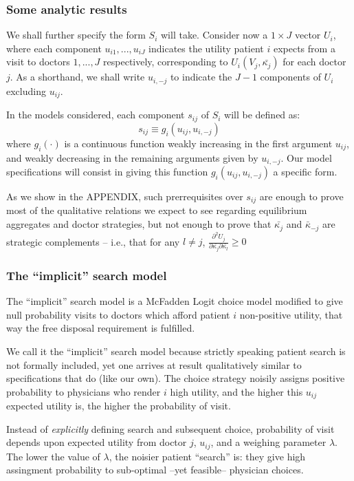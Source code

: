 \documentclass{article}
\begin{document}
\subsubsection{Some analytic results}

We shall further specify the form $S_i$ will take. Consider now a $1 \times J$ vector $U_i$, where each component $u_{i1}, ... , u_{iJ}$ indicates the utility patient $i$ expects from a visit to doctors $1, ..., J$ respectively, corresponding to $U_i(V_j, \bar{\kappa_j})$ for each doctor $j$. As a shorthand, we shall write $u_{i,-j}$ to indicate the $J - 1$ components of $U_i$ excluding $u_{ij}$.

In the models considered, each component $s_{ij}$ of $S_i$ will be defined as:
\[s_{ij} \equiv g_i(u_{ij}, u_{i,-j})\]
where $g_i(\cdot)$ is a continuous function weakly increasing in the first argument $u_{ij}$, and weakly decreasing in the remaining arguments given by $u_{i,-j}$. Our model specifications will consist in giving this function $g_i(u_{ij}, u_{i,-j})$ a specific form.

As we show in the APPENDIX, such prerrequisites over $s_{ij}$ are enough to prove most of the qualitative relations we expect to see regarding equilibrium aggregates and doctor strategies, but not enough to prove that $\bar{\kappa_j}$ and $\bar{\kappa}_{-j}$ are strategic complements -- i.e., that for any $l \neq j$, $\frac{\partial^2 U_{j}}{\partial\bar{\kappa_{j}} \partial\bar{\kappa_{l}}} \geq 0$

\subsubsection{The ``implicit'' search model}

The ``implicit'' search model is a McFadden Logit choice model modified to give null probability visits to doctors which afford patient $i$ non-positive utility, that way the free disposal requirement is fulfilled.

We call it the ``implicit'' search model because strictly speaking patient search is not formally included, yet one arrives at result qualitatively similar to specifications that do (like our own). The choice strategy noisily assigns positive probability to physicians who render $i$ high utility, and the higher this $u_{ij}$ expected utility is, the higher the probability of visit.

Instead of \textit{explicitly} defining search and subsequent choice, probability of visit depends upon expected utility from doctor $j$, $u_{ij}$, and a weighing parameter $\lambda$. The lower the value of $\lambda$, the noisier patient ``search'' is: they give high assingment probability to sub-optimal --yet feasible-- physician choices.
\end{document}
